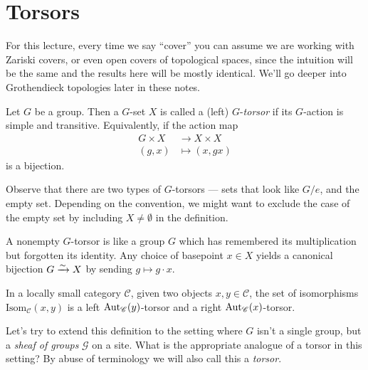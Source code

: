 \documentclass[11pt,openany]{book}
\begin{document}
\section{Torsors}

\begin{assumption} For this lecture, every time we say ``cover'' you can assume we are working with Zariski covers, or even open covers of topological spaces, since the intuition will be the same and the results here will be mostly identical. We'll go deeper into Grothendieck topologies later in these notes.
\end{assumption}

\begin{definition} Let $G$ be a group. Then a $G$-set $X$ is called a (left) $G$-\textit{torsor} if its $G$-action is simple and transitive. Equivalently, if the action map
\begin{equation}\label{eqn:torsor-G-set}
\begin{aligned}
    G \times X &\to X \times X \\
    (g,x) &\mapsto (x,gx)
\end{aligned}
\end{equation}
is a bijection.
\end{definition}


Observe that there are two types of $G$-torsors --- sets  that look like $G/e$, and the empty set. Depending on the convention, we might want to exclude the case of the empty set by including $X \ne \emptyset$ in the definition.

\begin{intuition} A nonempty $G$-torsor is like a group $G$ which has remembered its multiplication but forgotten its identity. Any choice of basepoint $x\in X$ yields a canonical bijection $G \xrightarrow{\sim} X$ by sending $g \mapsto g\cdot x$.
\end{intuition}

\begin{example} In a locally small category $\mathscr{C}$, given two objects $x,y \in \mathscr{C}$, the set of isomorphisms $\mathrm{Isom}_{\mathscr{C}}(x , y)$ is a left $\mathrm{Aut}_{\mathscr{C}}(y)$-torsor and a right $\mathrm{Aut}_{\mathscr{C}}(x)$-torsor.
\end{example}


Let's try to extend this definition to the setting where $G$ isn't a single group, but a \textit{sheaf of groups} $\mathcal{G}$ on a site. What is the appropriate analogue of a torsor in this setting? By abuse of terminology we will also call this a \textit{torsor}.
\end{document}
